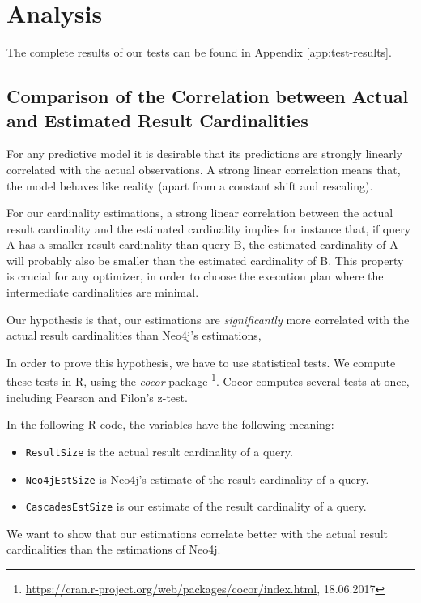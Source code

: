\section{Analysis}

The complete results of our tests can be found in Appendix
\ref{app:test-results}.

\subsection{Comparison of the Correlation between Actual and Estimated
            Result Cardinalities}

For any predictive model it is desirable that its predictions are strongly
linearly correlated with the actual observations.
A strong linear correlation means that, the model behaves like reality
(apart from a constant shift and rescaling).

For our cardinality estimations, a strong linear correlation
between the actual result cardinality and the estimated cardinality
implies for instance that, if query A has a smaller result cardinality than
query B, the estimated cardinality of A will probably also be smaller than
the estimated cardinality of B.
This property is crucial for any optimizer, in order to choose the execution
plan where the intermediate cardinalities are minimal.

Our hypothesis is that, our estimations are \emph{significantly}
more correlated with the actual result cardinalities than Neo4j's estimations,

In order to prove this hypothesis, we have to use statistical tests.
We compute these tests in R, using the \emph{cocor} package%
\cite{diedenhofen_cocor:_2015}%
\footnote{\url{https://cran.r-project.org/web/packages/cocor/index.html},
18.06.2017}.
Cocor computes several tests at once, including Pearson and Filon's z-test.

In the following R code, the variables have the following meaning:
\begin{itemize}
  \item \texttt{ResultSize} is the actual result cardinality of a query.
  \item \texttt{Neo4jEstSize} is Neo4j's estimate of the result cardinality
    of a query.
  \item \texttt{CascadesEstSize} is our estimate of the result cardinality
    of a query.
\end{itemize}

We want to show that our estimations correlate better with the actual result
cardinalities than the estimations of Neo4j.

